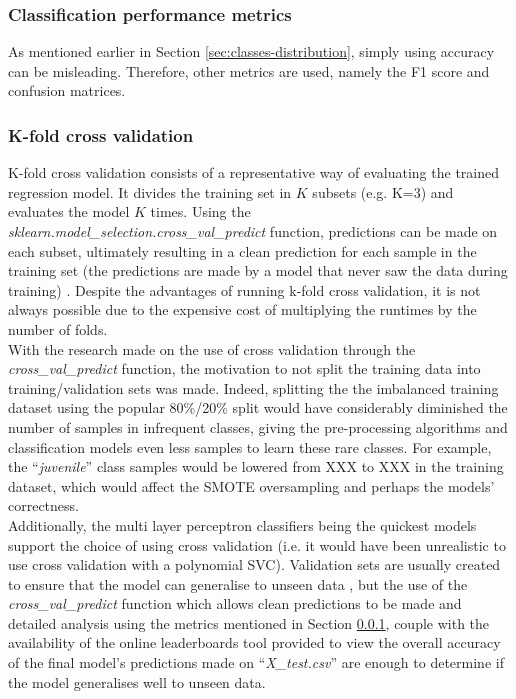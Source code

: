 \documentclass[letterpaper,12pt]{article}
\begin{document}
\subsubsection{Classification performance metrics}
\label{sec:performance-metrics}

As mentioned earlier in Section \ref{sec:classes-distribution}, simply using accuracy can be misleading. Therefore, other metrics are used, namely the F1 score and confusion matrices.

\subsubsection{K-fold cross validation}

K-fold cross validation consists of a representative way of evaluating the trained regression model. It divides the training set in $K$ subsets (e.g. K=3) and evaluates the model $K$ times. Using the \textit{sklearn.model\_selection.cross\_val\_predict} function, predictions can be made on each subset, ultimately resulting in a clean prediction for each sample in the training set (the predictions are made by a model that never saw the data during training) \cite{Geron2019}. Despite the advantages of running k-fold cross validation, it is not always possible due to the expensive cost of multiplying the runtimes by the number of folds.\\

With the research made on the use of cross validation through the \textit{cross\_val\_predict} function, the motivation to not split the training data into training/validation sets was made. Indeed, splitting  the the imbalanced training dataset using the popular 80\%/20\% split would have considerably diminished the number of samples  in infrequent classes, giving the pre-processing algorithms and classification models even less samples to learn these rare classes. For example, the ``\textit{juvenile}'' class samples would be lowered from XXX to XXX in the training dataset, which would affect the SMOTE oversampling and perhaps the models' correctness.\\

Additionally, the multi layer perceptron classifiers being the quickest  models  support the choice of using cross validation (i.e. it would have been unrealistic to use cross  validation with a polynomial SVC). Validation sets are usually created to ensure that the model can generalise to unseen data  \cite{Geron2019}, but the use of the \textit{cross\_val\_predict} function which allows clean predictions to be made and detailed analysis using the metrics mentioned in Section \ref{sec:performance-metrics}, couple with the availability of the online leaderboards tool provided to view the overall accuracy of the final model's predictions made on ``\textit{X\_test.csv}'' are enough to determine if the model generalises well to unseen data.
\end{document}
